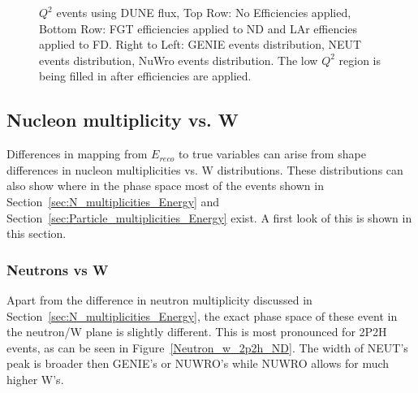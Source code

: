 \documentclass[12pt]{article}
\begin{document}
\begin{figure}[h]
\endminipage
\caption{$Q^2$ events using DUNE flux, Top Row: No Efficiencies applied, Bottom Row: FGT efficiencies applied to ND and LAr effiencies applied to FD. Right to Left: GENIE events distribution, NEUT events distribution, NuWro events distribution. The low $Q^2$ region is being filled in after efficiencies are applied.}
\label{fig:Q2_numu_CCOther_events}
\end{figure}
\FloatBarrier

\subsection{Nucleon multiplicity vs. W}

Differences in mapping from $E_{reco}$ to true variables can arise from shape differences in nucleon multiplicities vs. W distributions. 
These distributions can also show where in the phase space most of the events shown in Section~\ref{sec:N_multiplicities_Energy} and Section~\ref{sec:Particle_multiplicities_Energy} exist.  A first look of this is shown in this section.

\subsubsection{Neutrons vs W}

Apart from the difference in neutron multiplicity discussed in Section~\ref{sec:N_multiplicities_Energy}, the exact phase space of these event in the neutron/W plane is slightly different.  
This is most pronounced for 2P2H events, as can be seen in Figure~\ref{Neutron_w_2p2h_ND}. 
The width of NEUT's peak is broader then GENIE's or NUWRO's while NUWRO allows for much higher W's.
\end{document}
